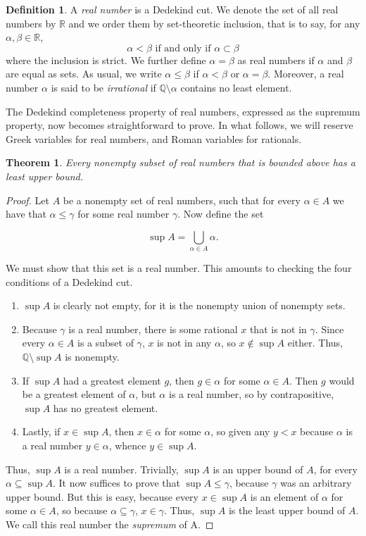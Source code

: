 \documentclass[12pt]{article}
\newtheorem{thm}{Theorem}
\theoremstyle{definition}
\newtheorem*{defn}{Definition}
\theoremstyle{definition}
\theoremstyle{definition}
\newcommand{\RR}{\mathbb{R}}
\newcommand{\QQ}{\mathbb{Q}}
\begin{document}
\begin{defn}
A \emph{real number} is a Dedekind cut.  We denote the set of all real numbers by $\RR$ and we
order them by set-theoretic inclusion, that is to say, for any $\alpha, \beta \in \RR$,
\[ \alpha < \beta \mbox{ if and only if } \alpha \subset \beta \]
where the inclusion is strict.  We further define $\alpha = \beta$ as real numbers 
if $\alpha$ and $\beta$ are equal as sets.  As usual, we write $\alpha \leq \beta$ 
if $\alpha < \beta$ or $\alpha=\beta$.  Moreover, a real number $\alpha$ is said to be \emph{irrational}
if $\QQ \setminus \alpha$ contains no least element.
\end{defn}

The Dedekind completeness property of real numbers, expressed as the supremum property, now becomes straightforward 
to prove.  In what follows, we will reserve Greek variables for real numbers, and Roman variables for rationals.

\begin{thm}
Every nonempty subset of real numbers that is bounded above has a least upper bound.
\end{thm}
\begin{proof}
Let $A$ be a nonempty set of real numbers, such that for every $\alpha \in A$ we have that
$\alpha \leq \gamma$ for some real number $\gamma$.  Now define the set 

\[ \sup A =  \bigcup_{\alpha \in A} \alpha. \]

We must show that this set is a real number.  This amounts to checking the four conditions
of a Dedekind cut. 
\begin{enumerate}
\item
$\sup A$ is clearly not empty, for it is the nonempty union of nonempty sets.

\item
Because $\gamma$ is a real number, there is some rational $x$ that is not in $\gamma$.  Since
every $\alpha \in A$ is a subset of $\gamma$, $x$ is not in any $\alpha$, so $x \not\in \sup A$
either.  Thus, $\QQ \setminus \sup A$ is nonempty.

\item
If $\sup A$ had a greatest element $g$, then $g \in \alpha$
for some $\alpha \in A$.  Then $g$ would be a greatest element of $\alpha$, but $\alpha$ is a real number, so 
by contrapositive, $\sup A$ has no greatest element. 
\item
Lastly, if $x \in \sup A$, then $x \in \alpha$ for some $\alpha$, so given any $y < x$ because $\alpha$ 
is a real number $y \in \alpha$, whence $y \in \sup A$. 
\end{enumerate}
Thus, $\sup A$ is a real number. Trivially, $\sup A$ is an upper bound of $A$, for every $\alpha \subseteq \sup A$.
It now suffices to prove that $\sup A \leq \gamma$, because $\gamma$ was an arbitrary
upper bound.  But this is easy, because
every $x \in \sup A$ is an element of $\alpha$ for some $\alpha \in A$, so because $\alpha \subseteq \gamma$, 
$x \in \gamma$.  Thus,
$\sup A$ is the least upper bound of $A$.  We call this real number the \emph{supremum} of A.
\end{proof}
\end{document}

